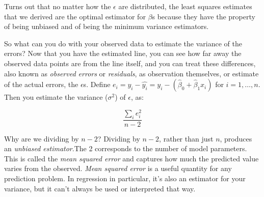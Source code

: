 \begin{tcolorbox}[enhanced jigsaw, breakable, pad at break*=1mm, colback=gray!20!white, colframe=black!85!black, title=\textbf{How to fit the model?}]
    Turns out that no matter how the \(\epsilon\) are distributed, the least squares estimates that we derived are the optimal estimator for \(\beta\)s because they have the property of being unbiased and of being the minimum variance estimators.
\end{tcolorbox}

So what can you do with your observed data to estimate the variance of the errors? Now that you have the estimated line, you can see how far away the observed data points are from the line itself, and you can treat these differences, also known as \textit{observed errors} or \textit{residuals}, as observation themselves, or estimate of the actual errors, the \(\epsilon\)s. Define \(e_{i}=y_{i}-\hat{y_{i}}=y_{i}-\left(\hat{\beta}_{0}+\hat{\beta}_{1} x_{i}\right)\) for \(i=1, \ldots, n\). Then you estimate the variance (\(\sigma^{2}\)) of \(\epsilon\), as:

\begin{equation}
    \frac{\sum_{i} e_{i}^{2}}{n-2}
\end{equation}

Why are we dividing by \(n-2\)? Dividing by \(n-2\), rather than just \(n\), produces an \textit{unbiased estimator}.The 2 corresponds to the number of model parameters. This is called the \textit{mean squared error} and captures how much the predicted value varies from the observed. \textit{Mean squared error} is a useful quantity for any prediction problem. In regression in particular, it's also an estimator for your variance, but it can't always be used or interpreted that way.

